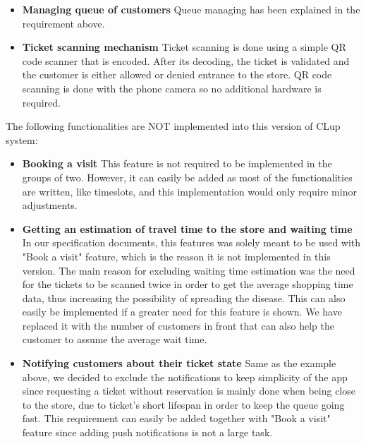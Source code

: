 \begin{itemize}
\item \textbf{Managing queue of customers}
\hspace{\parindent} Queue managing has been explained in the requirement above.
\item \textbf{Ticket scanning mechanism}
\hspace{\parindent} Ticket scanning is done using a simple QR code scanner that is encoded. After its decoding, the ticket is validated and the customer is either allowed or denied entrance to the store. QR code scanning is done with the phone camera so no additional hardware is required.
\end{itemize}

The following functionalities are NOT implemented into this version of CLup system:
\begin{itemize}
\item \textbf{ Booking a visit}
\hspace{\parindent} This feature is not required to be implemented in the groups of two. However, it can easily be added as most of the functionalities are written, like timeslots, and this implementation would only require minor adjustments. 
\item \textbf{Getting an estimation of travel time to the store and waiting time}
\hspace{\parindent} In our specification documents, this features was solely meant to be used with "Book a visit" feature, which is the reason it is not implemented in this version. The main reason for excluding waiting time estimation was the need for the tickets to be scanned twice in order to get the average shopping time data, thus increasing the possibility of spreading the disease. This can also easily be implemented if a greater need for this feature is shown. We have replaced it with the number of customers in front that can also help the customer to assume the average wait time.
\item \textbf{Notifying customers about their ticket state}
\hspace{\parindent} Same as the example above, we decided to exclude the notifications to keep simplicity of the app since requesting a ticket without reservation is mainly done when being close to the store, due to ticket's short lifespan in order to keep the queue going fast. This requirement can easily be added together with "Book a visit" feature since adding push notifications is not a large task.
\end{itemize}



